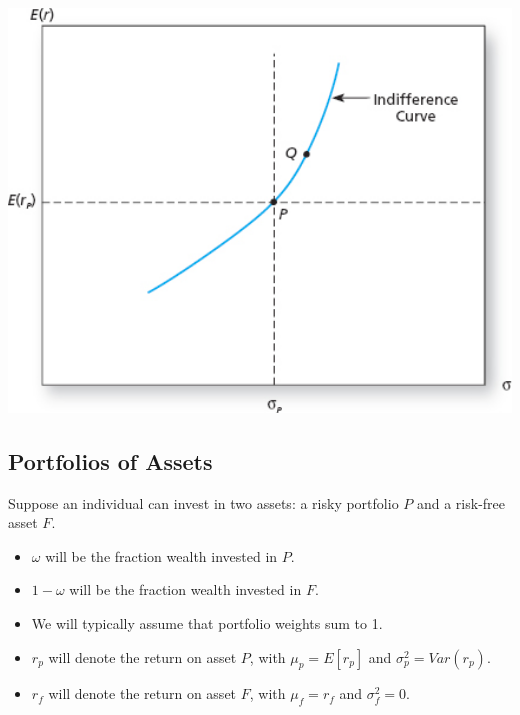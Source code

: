 \documentclass[letterpaper,10pt,english]{sphinxmanual}
\begin{document}
\includegraphics[width=6in]{pg165_2.jpg}


\subsection{Portfolios of Assets}
\label{allocation:portfolios-of-assets}
Suppose an individual can invest in two assets: a risky portfolio
$P$ and a risk-free asset $F$.
\begin{itemize}
\item {} 
$\omega$ will be the fraction wealth invested in
$P$.

\end{itemize}
\begin{itemize}
\item {} 
$1-\omega$ will be the fraction wealth invested in
$F$.

\end{itemize}
\begin{itemize}
\item {} 
We will typically assume that portfolio weights sum to
1.

\end{itemize}
\begin{itemize}
\item {} 
$r_p$ will denote the return on asset $P$, with
$\mu_p = E[r_p]$ and $\sigma_p^2 = Var(r_p)$.

\end{itemize}
\begin{itemize}
\item {} 
$r_f$ will denote the return on asset $F$, with
$\mu_f = r_f$ and $\sigma_f^2 = 0$.

\end{itemize}
\end{document}
